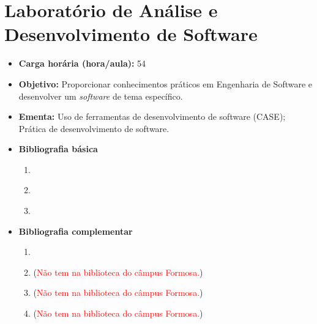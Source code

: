 \documentclass[11pt,fleqn]{book} %
\begin{document}
\section{Laboratório de Análise e Desenvolvimento de Software}\label{5_lab}
\begin{itemize}
	\item \textbf{Carga horária (hora/aula):} 54
	\item \textbf{Objetivo:} Proporcionar conhecimentos práticos em Engenharia de Software e desenvolver um \textit{software} de tema específico.
	\item \textbf{Ementa:}
	Uso de ferramentas de desenvolvimento de software (CASE);
	Prática de desenvolvimento de software.
	\item \textbf{Bibliografia básica}
	\begin{enumerate}
		\item \cite{sommerville2011engenharia}
		\item \cite{pressman2016engenharia}
		\item \cite{de2003engenharia}
	\end{enumerate}
	\item \textbf{Bibliografia complementar}
	\begin{enumerate}
		\item ~\cite{wazlawick2011analise}
		\item \cite{prikladnicki2014metodos}(\textcolor{red}{Não tem na biblioteca do câmpus Formosa.})
		\item \cite{hirama2012engenharia}(\textcolor{red}{Não tem na biblioteca do câmpus Formosa.})
		\item \cite{engholm2010engenharia}(\textcolor{red}{Não tem na biblioteca do câmpus Formosa.})
	\end{enumerate} 
\end{itemize}



\newpage
\end{document}
